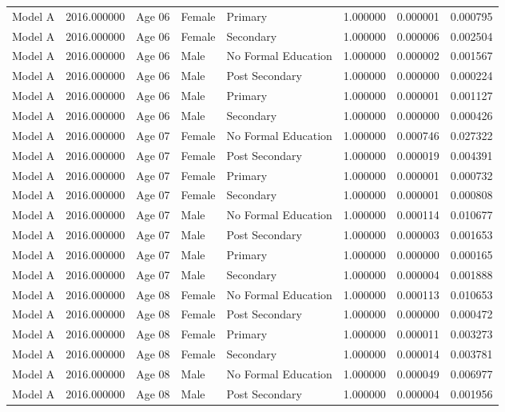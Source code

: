 \begin{table}[ht]
\begin{tabular}{lrlllrrr}
Model A & 2016.000000 & Age 06 & Female & Primary & 1.000000 & 0.000001 & 0.000795 \\
Model A & 2016.000000 & Age 06 & Female & Secondary & 1.000000 & 0.000006 & 0.002504 \\
Model A & 2016.000000 & Age 06 & Male & No Formal Education & 1.000000 & 0.000002 & 0.001567 \\
Model A & 2016.000000 & Age 06 & Male & Post Secondary & 1.000000 & 0.000000 & 0.000224 \\
Model A & 2016.000000 & Age 06 & Male & Primary & 1.000000 & 0.000001 & 0.001127 \\
Model A & 2016.000000 & Age 06 & Male & Secondary & 1.000000 & 0.000000 & 0.000426 \\
Model A & 2016.000000 & Age 07 & Female & No Formal Education & 1.000000 & 0.000746 & 0.027322 \\
Model A & 2016.000000 & Age 07 & Female & Post Secondary & 1.000000 & 0.000019 & 0.004391 \\
Model A & 2016.000000 & Age 07 & Female & Primary & 1.000000 & 0.000001 & 0.000732 \\
Model A & 2016.000000 & Age 07 & Female & Secondary & 1.000000 & 0.000001 & 0.000808 \\
Model A & 2016.000000 & Age 07 & Male & No Formal Education & 1.000000 & 0.000114 & 0.010677 \\
Model A & 2016.000000 & Age 07 & Male & Post Secondary & 1.000000 & 0.000003 & 0.001653 \\
Model A & 2016.000000 & Age 07 & Male & Primary & 1.000000 & 0.000000 & 0.000165 \\
Model A & 2016.000000 & Age 07 & Male & Secondary & 1.000000 & 0.000004 & 0.001888 \\
Model A & 2016.000000 & Age 08 & Female & No Formal Education & 1.000000 & 0.000113 & 0.010653 \\
Model A & 2016.000000 & Age 08 & Female & Post Secondary & 1.000000 & 0.000000 & 0.000472 \\
Model A & 2016.000000 & Age 08 & Female & Primary & 1.000000 & 0.000011 & 0.003273 \\
Model A & 2016.000000 & Age 08 & Female & Secondary & 1.000000 & 0.000014 & 0.003781 \\
Model A & 2016.000000 & Age 08 & Male & No Formal Education & 1.000000 & 0.000049 & 0.006977 \\
Model A & 2016.000000 & Age 08 & Male & Post Secondary & 1.000000 & 0.000004 & 0.001956 \\

\end{tabular}
\end{table}
